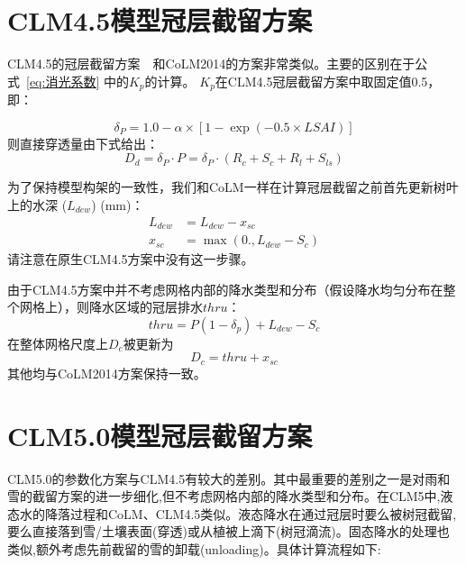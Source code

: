 \section{CLM4.5模型冠层截留方案}
CLM4.5的冠层截留方案~\citet{oleson2013technical}~和CoLM2014的方案非常类似。主要的区别在于公式~\eqref{eq:消光系数} 中的$K_p$的计算。
$K_p$在CLM4.5冠层截留方案中取固定值0.5，即：

\begin{equation}
\delta_{P}=1.0-\alpha \times\left[1-\exp \left(-0.5 \times LSAI\right)\right]
\end{equation}
则直接穿透量由下式给出：
\begin{equation}
D_{d}=\delta_{P} \cdot P=\delta_{P} \cdot\left(R_{c}+S_{c}+R_{l}+S_{l s}\right)
\end{equation}

为了保持模型构架的一致性，我们和CoLM一样在计算冠层截留之前首先更新树叶上的水深 ($L_{dew}$) (mm)：
\begin{equation}
\begin{aligned}
L_{dew} &= L_{dew}-x_{sc} \\
x_{s c} &= \max \left(0., L_{dew}-S_{c}\right)
\end{aligned}
\end{equation}
请注意在原生CLM4.5方案中没有这一步骤。

由于CLM4.5方案中并不考虑网格内部的降水类型和分布（假设降水均匀分布在整个网格上），则降水区域的冠层排水$thru$：
\begin{equation}
thru=P\left(1-\delta_{p}\right)+L_{dew}-S_{c}
\end{equation}
在整体网格尺度上$D_c$被更新为
\begin{equation}
D_c=thru+x_{s c}
\end{equation}
其他均与CoLM2014方案保持一致。

\section{CLM5.0模型冠层截留方案}
CLM5.0的参数化方案与CLM4.5有较大的差别\citep{lawrence2019community}。其中最重要的差别之一是对雨和雪的截留方案的进一步细化,但不考虑网格内部的降水类型和分布。在CLM5中,液态水的降落过程和CoLM、CLM4.5类似。液态降水在通过冠层时要么被树冠截留,要么直接落到雪/土壤表面(穿透)或从植被上滴下(树冠滴流)。固态降水的处理也类似,额外考虑先前截留的雪的卸载(unloading)。具体计算流程如下:

